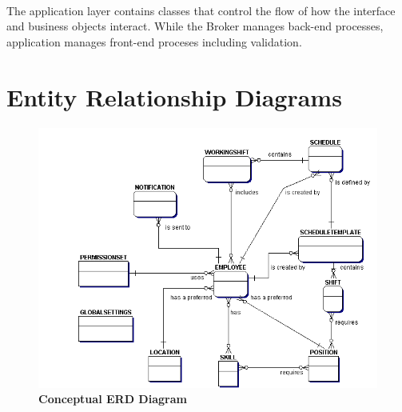 \documentclass[letterpaper,12pt]{report}
\begin{document}
\paragraph*{}\hspace{0.6cm}The application layer contains classes that control the flow of how the interface and business objects interact. While the Broker manages back-end processes, application manages front-end proceses including validation.
\pagebreak
\section{Entity Relationship Diagrams}
\pagebreak
{
\begin{figure}[ConceptualERD]
 \centering
 \includegraphics[scale=0.8,trim=30mm 00mm 20mm 10mm]{externals/ConceptualERD.png}
 \caption{\small
\textbf{Conceptual ERD Diagram}}\label{fig:conceptERD}
\end{figure}
\pagebreak
\newpage
\begin{figure}[ImplementationERD]
 \centering

\end{figure}}
\end{document}
